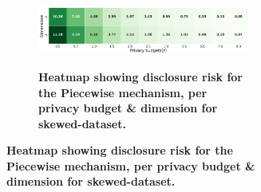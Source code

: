 \begin{figure}
\begin{subfigure}[b]{0.85\textwidth}
        \begin{subfigure}[c]{1\textwidth}
            \caption{\textbf{Heatmap showing disclosure risk for the Piecewise mechanism, per privacy budget \& dimension for skewed-dataset.}}
            \includegraphics[width=1\textwidth]{Results/kd-laplace/piecewise/skewed-dataset/distance.png}
            \label{fig:privacy-risk_skewed-dataset_adversial_advantage_piecewise}
        \end{subfigure}
    \end{subfigure}
    \hfill %
    \begin{subfigure}[b]{0.075\textwidth}

\end{subfigure}
\end{figure}
